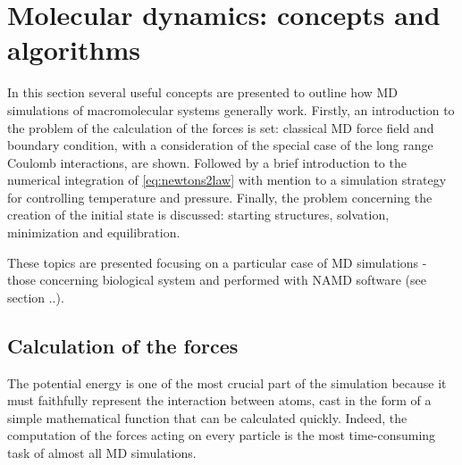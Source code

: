 \section{Molecular dynamics: concepts and algorithms}

In this section several useful concepts are presented to outline how MD simulations of macromolecular systems generally work. Firstly, an introduction to the problem of the calculation of the forces is set: classical MD force field and boundary condition, with a consideration of the special case of the long range Coulomb interactions, are shown. Followed by a brief introduction to the numerical integration of \eqref{eq:newtons2law} with mention to a simulation strategy for controlling temperature and pressure. Finally, the problem concerning the creation of the initial state is discussed: starting structures, solvation, minimization and equilibration.

These topics are presented focusing on a particular case of MD simulations - those concerning biological system and performed with NAMD software (see section ..). 


\subsection{Calculation of the forces}
The potential energy is one of the most crucial part of the simulation because it must faithfully represent the interaction between atoms, cast in the form of a simple mathematical function that can be calculated quickly. Indeed, the computation of the forces acting on every particle is the most time-consuming task of almost all MD simulations.

